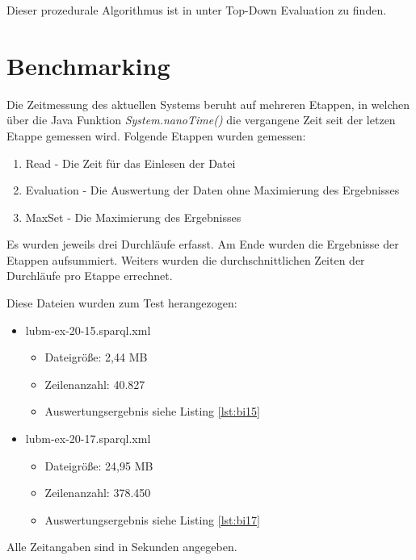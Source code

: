 \documentclass[draft,final]{vutinfth} %
\begin{document}
Dieser prozedurale Algorithmus ist in \cite[S.~175]{OptMat} unter Top-Down Evaluation zu finden.

\section{Benchmarking} \label{benchmarking}

Die Zeitmessung des aktuellen Systems beruht auf mehreren Etappen, in welchen über die Java Funktion \textit{System.nanoTime()} die vergangene Zeit seit der letzen Etappe gemessen wird. Folgende Etappen wurden gemessen:
\begin{enumerate}
	\item Read - Die Zeit für das Einlesen der Datei
	\item Evaluation - Die Auswertung der Daten ohne Maximierung des Ergebnisses
	\item MaxSet - Die Maximierung des Ergebnisses
\end{enumerate}

Es wurden jeweils drei Durchläufe erfasst. Am Ende wurden die Ergebnisse der Etappen aufsummiert. Weiters wurden die durchschnittlichen Zeiten der Durchläufe pro Etappe errechnet.

Diese Dateien wurden zum Test herangezogen:
\begin{itemize}
	\item lubm-ex-20-15.sparql.xml
	\begin{itemize}
		\item Dateigrö{\ss}e: 2,44 MB
		\item Zeilenanzahl: 40.827
		\item Auswertungsergebnis siehe Listing \ref{lst:bi15}
	\end{itemize}
	\item lubm-ex-20-17.sparql.xml
	\begin{itemize}
		\item Dateigrö{\ss}e: 24,95 MB
		\item Zeilenanzahl: 378.450
		\item Auswertungsergebnis siehe Listing \ref{lst:bi17}
	\end{itemize}
\end{itemize}

Alle Zeitangaben sind in Sekunden angegeben.
\end{document}
